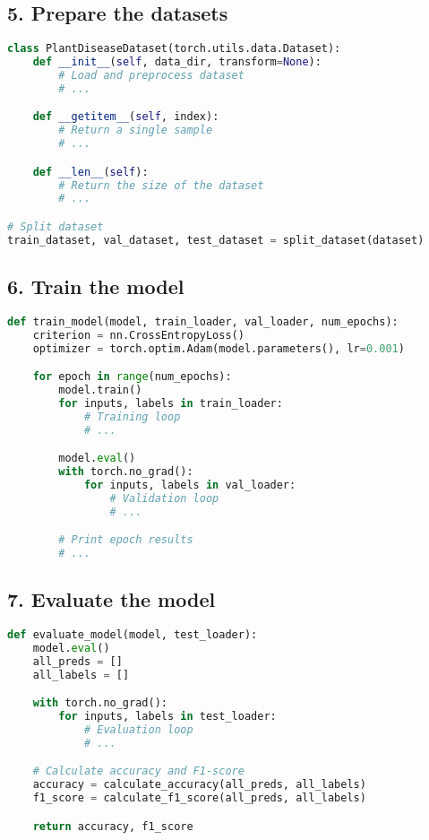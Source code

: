\documentclass[12pt,a4paper]{article}
\begin{document}
\subsection{5. Prepare the datasets}
\begin{lstlisting}[language=Python, caption=Dataset Preparation]
class PlantDiseaseDataset(torch.utils.data.Dataset):
    def __init__(self, data_dir, transform=None):
        # Load and preprocess dataset
        # ...

    def __getitem__(self, index):
        # Return a single sample
        # ...

    def __len__(self):
        # Return the size of the dataset
        # ...

# Split dataset
train_dataset, val_dataset, test_dataset = split_dataset(dataset)
\end{lstlisting}

\subsection{6. Train the model}
\begin{lstlisting}[language=Python, caption=Model Training]
def train_model(model, train_loader, val_loader, num_epochs):
    criterion = nn.CrossEntropyLoss()
    optimizer = torch.optim.Adam(model.parameters(), lr=0.001)

    for epoch in range(num_epochs):
        model.train()
        for inputs, labels in train_loader:
            # Training loop
            # ...

        model.eval()
        with torch.no_grad():
            for inputs, labels in val_loader:
                # Validation loop
                # ...

        # Print epoch results
        # ...
\end{lstlisting}

\subsection{7. Evaluate the model}
\begin{lstlisting}[language=Python, caption=Model Evaluation]
def evaluate_model(model, test_loader):
    model.eval()
    all_preds = []
    all_labels = []

    with torch.no_grad():
        for inputs, labels in test_loader:
            # Evaluation loop
            # ...

    # Calculate accuracy and F1-score
    accuracy = calculate_accuracy(all_preds, all_labels)
    f1_score = calculate_f1_score(all_preds, all_labels)

    return accuracy, f1_score
\end{lstlisting}
\end{document}
